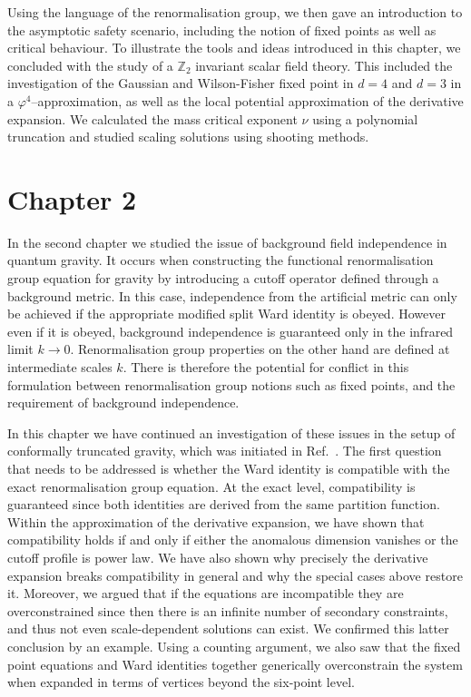 \documentclass[11pt]{book}
\numberwithin{equation}{chapter}
\begin{document}
Using the language of the renormalisation group, we then gave an introduction
to the asymptotic safety scenario, including the notion of fixed points
as well as critical behaviour. To illustrate the tools and ideas introduced
in this chapter, we concluded with the study of a $\mathbb Z_2$ invariant
scalar field theory. This included the investigation of the
Gaussian and Wilson-Fisher fixed point in $d=4$ and $d=3$ in a
$\varphi^4$--approximation, as well as the local potential approximation
of the derivative expansion.
We calculated the mass critical exponent $\nu$ using a polynomial truncation
and studied scaling solutions using shooting methods.

\section*{Chapter 2}

In the second chapter we studied the issue of background field independence in quantum gravity.
It occurs when constructing the functional renormalisation group equation for gravity by introducing a
cutoff operator defined through a background metric. In this case, independence from the artificial
metric can only be achieved if the appropriate modified split Ward identity is obeyed.
However even if it is obeyed, background independence is guaranteed
only in the infrared limit $k\to0$.
Renormalisation group properties on the other hand are defined at intermediate scales $k$.
There is therefore the potential for conflict in this formulation between
renormalisation group notions such as fixed points,
and the requirement of background independence.

In this chapter we have continued an investigation of these issues
in the setup of conformally truncated gravity, which was initiated in Ref.~\cite{Dietz:2015owa}.
The first question that needs to be addressed is whether the Ward identity
is compatible with the exact renormalisation group equation.
At the exact level, compatibility is guaranteed since both identities
are derived from the same partition function.
Within the approximation of the derivative expansion,
we have shown that compatibility holds if and only if either the anomalous
dimension vanishes or the cutoff profile is power law.
We have also shown why precisely the derivative expansion breaks compatibility
in general and why the special cases above restore it.
Moreover, we argued that if the equations are incompatible they are overconstrained
since then there is an infinite number of secondary constraints,
and thus not even scale-dependent solutions can exist.
We confirmed this latter conclusion by an example.
Using a counting argument, we also saw that the fixed point equations and Ward identities together
generically overconstrain the system when expanded in terms of vertices beyond the six-point level.
\end{document}
